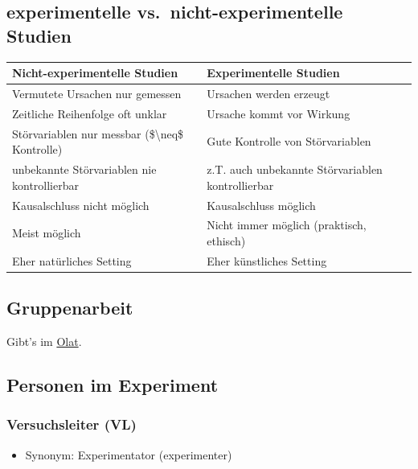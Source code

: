 \documentclass[
]{book}
\providecommand{\tightlist}{%
  \setlength{\itemsep}{0pt}\setlength{\parskip}{0pt}}
\begin{document}
\hypertarget{experimentelle-vs.-nicht-experimentelle-studien}{%
\subsection{experimentelle vs.~nicht-experimentelle Studien}\label{experimentelle-vs.-nicht-experimentelle-studien}}

\begin{tabular}[t]{ll}
\toprule
Nicht-experimentelle Studien &  Experimentelle Studien\\
\midrule
Vermutete Ursachen nur gemessen & Ursachen werden erzeugt\\
Zeitliche Reihenfolge oft unklar & Ursache kommt vor Wirkung\\
Störvariablen nur messbar (\$\textbackslash{}neq\$ Kontrolle) & Gute Kontrolle von Störvariablen\\
unbekannte Störvariablen nie kontrollierbar & z.T. auch unbekannte Störvariablen kontrollierbar\\
Kausalschluss nicht möglich & Kausalschluss möglich\\
\addlinespace
Meist möglich & Nicht immer möglich (praktisch, ethisch)\\
Eher natürliches Setting & Eher künstliches Setting\\
\bottomrule
\end{tabular}

\hypertarget{gruppenarbeit}{%
\subsection{Gruppenarbeit}\label{gruppenarbeit}}

Gibt's im \href{https://lms.uni-kiel.de/auth/RepositoryEntry/3715989588/CourseNode/102596614637734}{Olat}.

\hypertarget{personen-im-experiment}{%
\subsection{Personen im Experiment}\label{personen-im-experiment}}

\hypertarget{versuchsleiter-vl}{%
\subsubsection{Versuchsleiter (VL)}\label{versuchsleiter-vl}}

\begin{itemize}
\tightlist
\item
  Synonym: Experimentator (experimenter)
\end{itemize}
\end{document}
